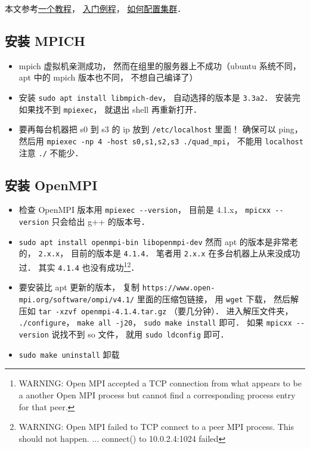 
\begin{issues}
\issueDraft
\end{issues}

本文参考\href{https://www.codingame.com/playgrounds/349/introduction-to-mpi/introduction-to-distributed-computing}{一个教程}， \href{https://people.sc.fsu.edu/~jburkardt/cpp_src/hello_mpi/hello_mpi.html}{入门例程}， \href{https://mpitutorial.com/tutorials/running-an-mpi-cluster-within-a-lan/}{如何配置集群}．

\subsection{安装 MPICH}
\begin{itemize}
\item mpich 虚拟机亲测成功， 然而在组里的服务器上不成功（ubuntu 系统不同， apt 中的 mpich 版本也不同， 不想自己编译了）
\item 安装 \verb|sudo apt install libmpich-dev|， 自动选择的版本是 \verb|3.3a2|． 安装完如果找不到 \verb|mpiexec|， 就退出 shell 再重新打开．
\item 要再每台机器把 s0 到 s3 的 ip 放到 \verb|/etc/localhost| 里面！ 确保可以 ping， 然后用 \verb|mpiexec -np 4 -host s0,s1,s2,s3 ./quad_mpi|， 不能用 \verb|localhost| 注意 \verb|./| 不能少．
\end{itemize}

\subsection{安装 OpenMPI}
\begin{itemize}
\item 检查 OpenMPI 版本用 \verb|mpiexec --version|， 目前是 4.1.x， \verb|mpicxx --version| 只会给出 g++ 的版本号．
\item \verb|sudo apt install openmpi-bin libopenmpi-dev| 然而 apt 的版本是非常老的， \verb|2.x.x|， 目前的版本是 \verb|4.1.4|． 笔者用 \verb|2.x.x| 在多台机器上从来没成功过． 其实 \verb|4.1.4| 也没有成功\footnote{WARNING: Open MPI accepted a TCP connection from what appears to be a another Open MPI process but cannot find a corresponding process entry for that peer.}\footnote{WARNING: Open MPI failed to TCP connect to a peer MPI process.  This should not happen. ... connect() to 10.0.2.4:1024 failed}．
\item 要安装比 apt 更新的版本， 复制 \verb|https://www.open-mpi.org/software/ompi/v4.1/| 里面的压缩包链接， 用 \verb|wget| 下载， 然后解压如 \verb|tar -xzvf openmpi-4.1.4.tar.gz| （要几分钟）． 进入解压文件夹， \verb|./configure|， \verb|make all -j20|， \verb|sudo make install| 即可． 如果 \verb|mpicxx --version| 说找不到 so 文件， 就用 \verb|sudo ldconfig| 即可．
\item \verb|sudo make uninstall| 卸载
\end{itemize}

